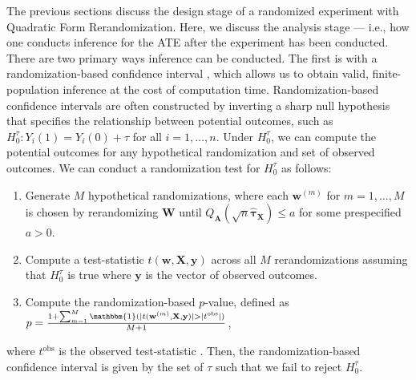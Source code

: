 \documentclass[11pt,twoside]{article}
\theoremstyle{definition}
\theoremstyle{remark}
\begin{document}
The previous sections discuss the design stage of a randomized experiment with Quadratic Form Rerandomization. Here, we discuss the analysis stage --- i.e., how one conducts inference for the ATE after the experiment has been conducted. There are two primary ways inference can be conducted. The first is with a randomization-based confidence interval \citep[Chapter 2]{rosenbaum2002}, which allows us to obtain valid, finite-population inference at the cost of computation time. Randomization-based confidence intervals are often constructed by inverting a sharp null hypothesis that specifies the relationship between potential outcomes, such as $H_0^{\tau}: Y_i(1) = Y_i(0) + \tau$ for all $i = 1, \ldots, n$. Under $H_0^{\tau}$, we can compute the potential outcomes for any hypothetical randomization and set of observed outcomes. We can conduct a randomization test for $H_0^{\tau}$ as follows:
\begin{enumerate}
    \item[1.] Generate $M$ hypothetical randomizations, where each $\mathbf{w}^{(m)}$ for $m = 1,\ldots, M$ is chosen by rerandomizing $\mathbf{W}$ until $Q_{\mathbf{A}}(\sqrt{n} \widehat{\bm{\tau}}_{\mathbf{X}}) \leq a$ for some prespecified $a > 0$.
    \item[2.] Compute a test-statistic $t(\mathbf{w}, \mathbf{X}, \mathbf{y})$ across all $M$ rerandomizations assuming that $H^\tau_0$ is true where $\mathbf{y}$ is the vector of observed outcomes.
    \item[3.] Compute the randomization-based $p$-value, defined as $ p = \frac{1 + \sum^M_{m=1} \mathbbm{1}(| t(\mathbf{w}^{(m)}, \mathbf{X}, \mathbf{y})| > |t^{\text{obs}}|)}{M + 1}$,
\end{enumerate}
where $t^{\text{obs}}$ is the observed test-statistic \citep{phipson2010permutation}. Then, the randomization-based confidence interval is given by the set of $\tau$ such that we fail to reject $H_0^{\tau}$.
\end{document}
